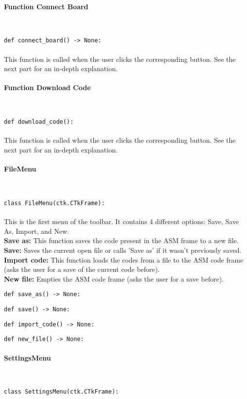 \documentclass{article}
\newcommand{\subsubsubsection}[1]{\paragraph{#1}\mbox{}\\}
\begin{document}
\subsubsubsection{Function Connect Board}
\begin{lstlisting}[language=MyPython]
def connect_board() -> None:
\end{lstlisting}
\paragraph{}

This function is called when the user clicks the corresponding button. See the next part for an in-depth explanation. \\

\subsubsubsection{Function Download Code}
\begin{lstlisting}[language=MyPython]
def download_code():
\end{lstlisting}
\paragraph{}

This function is called when the user clicks the corresponding button. See the next part for an in-depth explanation. \\

\subsubsubsection{FileMenu}
\begin{lstlisting}[language=MyPython]
class FileMenu(ctk.CTkFrame):
\end{lstlisting}
\paragraph{}

This is the first menu of the toolbar. It contains 4 different options: Save, Save As, Import, and New.\\
\textbf{Save as:} This function saves the code present in the ASM frame to a new file. \\
\textbf{Save:} Saves the current open file or calls 'Save as' if it wasn't previously saved. \\
\textbf{Import code:} This function loads the codes from a file to the ASM code frame (asks the user for a save of the current code before). \\
\textbf{New file:} Empties the ASM code frame (asks the user for a save before). \\

\begin{lstlisting}[language=MyPython]
def save_as() -> None:
\end{lstlisting}
\begin{lstlisting}[language=MyPython]
def save() -> None:
\end{lstlisting}
\begin{lstlisting}[language=MyPython]
def import_code() -> None:
\end{lstlisting}
\begin{lstlisting}[language=MyPython]
def new_file() -> None:
\end{lstlisting}
\subsubsubsection{SettingsMenu}
\begin{lstlisting}[language=MyPython]
class SettingsMenu(ctk.CTkFrame):
\end{lstlisting}
\end{document}
